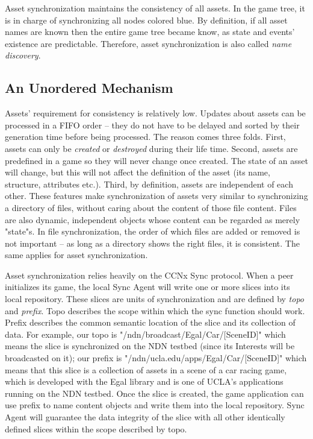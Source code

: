 Asset synchronization maintains the consistency of all assets. In the game tree, it is in charge of synchronizing all nodes colored blue. By definition, if all asset names are known then the entire game tree became know, as state and events' existence are predictable. Therefore, asset synchronization is also called \emph{name discovery}.

\subsection{An Unordered Mechanism}

Assets' requirement for consistency is relatively low. Updates about assets can be processed in a FIFO order -- they do not have to be delayed and sorted by their generation time before being processed. The reason comes three folds. First, assets can only be \emph{created} or \emph{destroyed} during their life time. Second, assets are predefined in a game so they will never change once created. The state of an asset will change, but this will not affect the definition of the asset (its name, structure, attributes etc.). Third, by definition, assets are independent of each other. These features make synchronization of assets very similar to synchronizing a directory of files, without caring about the content of those file content.  Files are also dynamic, independent objects whose content can be regarded as merely "state"s. In file synchronization, the order of which files are added or removed is not important -- as long as a directory shows the right files, it is consistent. The same applies for asset synchronization.

Asset synchronization relies heavily on the CCNx Sync protocol. When a peer initializes its game, the local Sync Agent will write one or more slices into its local repository. These slices are units of synchronization and are defined by \emph{topo} and \emph{prefix}. Topo describes the scope within which the sync function should work. Prefix describes the common semantic location of the slice and its collection of data. For example, our topo is "{/ndn/broadcast/Egal/Car/[SceneID]}" which means the slice is synchronized on the NDN testbed (since its Interests will be broadcasted on it); our prefix is "{/ndn/ucla.edu/apps/Egal/Car/[SceneID]}" which means that this slice is a collection of assets in a scene of a car racing game, which is developed with the Egal library and is one of UCLA's applications running on the NDN testbed. Once the slice is created, the game application can use prefix to name content objects and write them into the local repository. Sync Agent will guarantee the data integrity of the slice with all other identically defined slices within the scope described by topo.

